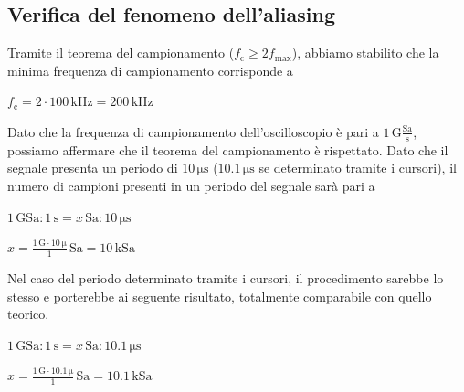 \documentclass[a4paper]{article}
\begin{document}
		\subsection{Verifica del fenomeno dell’aliasing}
			Tramite il teorema del campionamento ($ f_{\mathrm{c}} \geq 2 f_{\mathrm{max}} $), abbiamo stabilito che la minima frequenza di campionamento corrisponde a
			\newline
			\begin{center}
				$ f_{\mathrm{c}} = 2 \cdot 100 \, \mathrm{kHz} = 200 \, \mathrm{kHz} $
			\end{center}
			\newline
			Dato che la frequenza di campionamento dell'oscilloscopio è pari a $ 1 \, \mathrm{G\frac{Sa}{s}} $, possiamo affermare che il teorema del campionamento è rispettato.
			\newline
			Dato che il segnale presenta un periodo di $ 10 \, \mathrm{\mu s} $ ($ 10.1 \, \mathrm{\mu s} $ se determinato tramite i cursori), il numero di campioni presenti in un periodo del segnale sarà pari a
			\newline
			\begin{center}
				$ 1 \, \mathrm{GSa} : 1 \, \mathrm{s} = x \, \mathrm{Sa} : 10 \, \mathrm{\mu s} $
			\end{center}
			\newline
			\begin{center}
				$ x = \mathrm{\frac{1 \, G \cdot 10 \, \mu}{1}} \, \mathrm{Sa} = 10 \, \mathrm{kSa} $
			\end{center}
			\newline
			Nel caso del periodo determinato tramite i cursori, il procedimento sarebbe lo stesso e porterebbe ai seguente risultato, totalmente comparabile con quello teorico.
			\newline
			\begin{center}
				$ 1 \, \mathrm{GSa} : 1 \, \mathrm{s} = x \, \mathrm{Sa} : 10.1 \, \mathrm{\mu s} $
			\end{center}
			\newline
			\begin{center}
				$ x = \mathrm{\frac{1 \, G \cdot 10.1 \, \mu}{1}} \, \mathrm{Sa} = 10.1 \, \mathrm{kSa} $
			\end{center}
\end{document}
